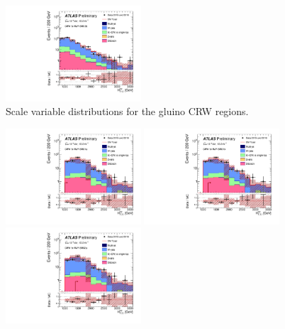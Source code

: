 \begin{figure}[tbph]
\begin{center}
\includegraphics[width=0.45\textwidth]{figures/ATLAS-CONF-2016-078_INT/N-1Plots/AtlasStyle/Preliminary/CRW_SRJigsawSRG3b_LastCut_CRW_minusone}
\end{center}
\caption{Scale variable distributions for the gluino CRW regions.}
\label{fig:CRW_SRJigsawSRG1a_LastCut_CRW_minusone}
\end{figure}

\begin{figure}[tbph]
\begin{center}
\includegraphics[width=0.45\textwidth]{figures/ATLAS-CONF-2016-078_INT/N-1Plots/AtlasStyle/Preliminary/CRW_SRJigsawSRS1a_LastCut_CRW_minusone}
\includegraphics[width=0.45\textwidth]{figures/ATLAS-CONF-2016-078_INT/N-1Plots/AtlasStyle/Preliminary/CRW_SRJigsawSRS1b_LastCut_CRW_minusone}
\includegraphics[width=0.45\textwidth]{figures/ATLAS-CONF-2016-078_INT/N-1Plots/AtlasStyle/Preliminary/CRW_SRJigsawSRS2a_LastCut_CRW_minusone}

\end{center}
\end{figure}
